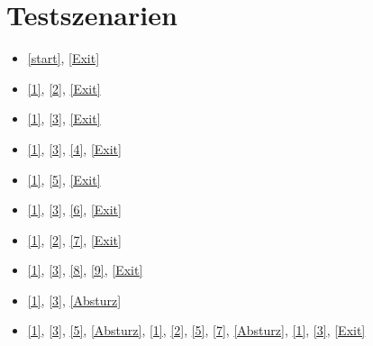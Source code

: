 \section{Testszenarien}

\begin{itemize}
  \item \ref{start}, \ref{Exit}
  \item \ref{1}, \ref{2}, \ref{Exit}
  \item \ref{1}, \ref{3}, \ref{Exit}
  \item \ref{1}, \ref{3}, \ref{4}, \ref{Exit}
  \item \ref{1}, \ref{5}, \ref{Exit}
  \item \ref{1}, \ref{3}, \ref{6}, \ref{Exit}
  \item \ref{1}, \ref{2}, \ref{7}, \ref{Exit}
  \item \ref{1}, \ref{3}, \ref{8}, \ref{9}, \ref{Exit}
  \item \ref{1}, \ref{3}, \ref{Absturz}
  \item \ref{1}, \ref{3}, \ref{5}, \ref{Absturz}, \ref{1}, \ref{2}, \ref{5}, \ref{7}, \ref{Absturz}, \ref{1}, \ref{3}, \ref{Exit}
\end{itemize}